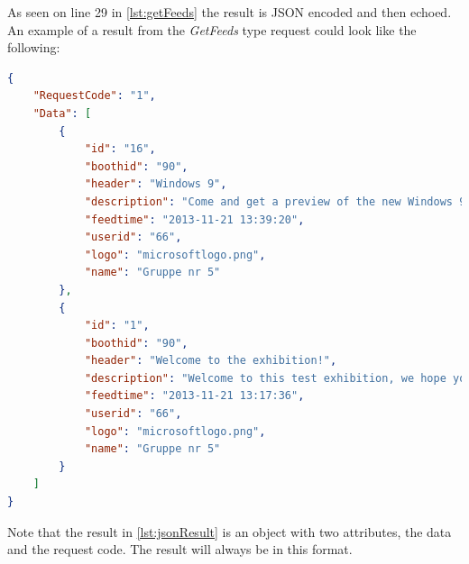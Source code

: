 As seen on line 29 in \autoref{lst:getFeeds} the result is JSON encoded and then echoed. An example of a result from the \textit{GetFeeds} type request could look like the following:

\begin{lstlisting}[language=json, label=lst:jsonResult, caption=Example result from a request with type: \textit{GetFeeds}]
{
    "RequestCode": "1",
    "Data": [
        {
            "id": "16",
            "boothid": "90",
            "header": "Windows 9",
            "description": "Come and get a preview of the new Windows 9!",
            "feedtime": "2013-11-21 13:39:20",
            "userid": "66",
            "logo": "microsoftlogo.png",
            "name": "Gruppe nr 5"
        },
        {
            "id": "1",
            "boothid": "90",
            "header": "Welcome to the exhibition!",
            "description": "Welcome to this test exhibition, we hope you enjoy your stay.",
            "feedtime": "2013-11-21 13:17:36",
            "userid": "66",
            "logo": "microsoftlogo.png",
            "name": "Gruppe nr 5"
        }
    ]
}
\end{lstlisting}

Note that the result in \autoref{lst:jsonResult} is an object with two attributes, the data and the request code. The result will always be in this format.

